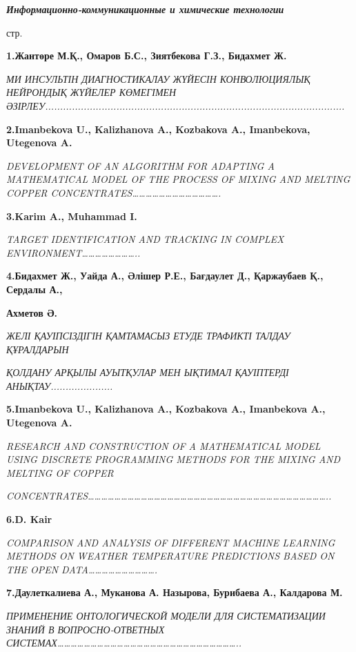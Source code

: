 \emph{{\bfseries Информационно-коммуникационные и химические технологии}}

стр.

{\bfseries 1.Жантөре М.Қ., Омаров Б.С., Зиятбекова Г.З., Бидахмет Ж.}

\emph{МИ ИНСУЛЬТІН ДИАГНОСТИКАЛАУ ЖҮЙЕСІН КОНВОЛЮЦИЯЛЫҚ НЕЙРОНДЫҚ
ЖҮЙЕЛЕР КӨМЕГІМЕН
ӘЗІРЛЕУ.....................................................................................................}

{\bfseries 2.Imanbekova U., Kalizhanova A., Kozbakova A., Imanbekova,
Utegenova A.}

\emph{DEVELOPMENT OF AN ALGORITHM FOR ADAPTING A MATHEMATICAL MODEL OF
THE PROCESS OF MIXING AND MELTING COPPER
CONCENTRATES\ldots\ldots\ldots\ldots\ldots\ldots\ldots\ldots\ldots\ldots\ldots\ldots\ldots.}

{\bfseries 3.Karim A., Muhammad I.}

\emph{TARGET IDENTIFICATION AND TRACKING IN COMPLEX
ENVIRONMENT\ldots\ldots\ldots\ldots\ldots\ldots\ldots\ldots..}

{\bfseries 4.Бидахмет Ж., Уайда А., Әлішер Р.Е., Бағдаулет Д., Қаржаубаев
Қ., Сердалы А.,}

{\bfseries Ахметов Ә.}

\emph{ЖЕЛІ ҚАУІПСІЗДІГІН ҚАМТАМАСЫЗ ЕТУДЕ ТРАФИКТІ ТАЛДАУ ҚҰРАЛДАРЫН}

\emph{ҚОЛДАНУ АРҚЫЛЫ АУЫТҚУЛАР МЕН ЫҚТИМАЛ ҚАУІПТЕРДІ
АНЫҚТАУ.....................}

{\bfseries 5.Imanbekova U., Kalizhanova A., Kozbakova A., Imanbekova A.,
Utegenova A.}

\emph{RESEARCH AND CONSTRUCTION OF A MATHEMATICAL MODEL USING DISCRETE
PROGRAMMING METHODS FOR THE MIXING AND MELTING OF COPPER}

\emph{CONCENTRATES\ldots\ldots\ldots\ldots\ldots\ldots\ldots\ldots\ldots\ldots\ldots\ldots\ldots\ldots\ldots\ldots\ldots\ldots\ldots\ldots\ldots\ldots\ldots\ldots\ldots\ldots\ldots\ldots\ldots\ldots\ldots\ldots\ldots\ldots\ldots\ldots..}

{\bfseries 6.D. Kair}

\emph{COMPARISON AND ANALYSIS OF DIFFERENT MACHINE LEARNING METHODS ON
WEATHER TEMPERATURE PREDICTIONS BASED ON THE OPEN
DATA\ldots\ldots\ldots\ldots\ldots\ldots\ldots\ldots\ldots\ldots.}

{\bfseries 7.Даулеткалиева А., Муканова А. Назырова, Бурибаева А.,
Калдарова М.}

\emph{ПРИМЕНЕНИЕ ОНТОЛОГИЧЕСКОЙ МОДЕЛИ ДЛЯ СИСТЕМАТИЗАЦИИ ЗНАНИЙ В
ВОПРОСНО-ОТВЕТНЫХ
СИСТЕМАХ\ldots\ldots\ldots\ldots\ldots\ldots\ldots\ldots\ldots\ldots\ldots\ldots\ldots\ldots\ldots\ldots\ldots\ldots\ldots\ldots\ldots\ldots\ldots\ldots\ldots\ldots\ldots..}

